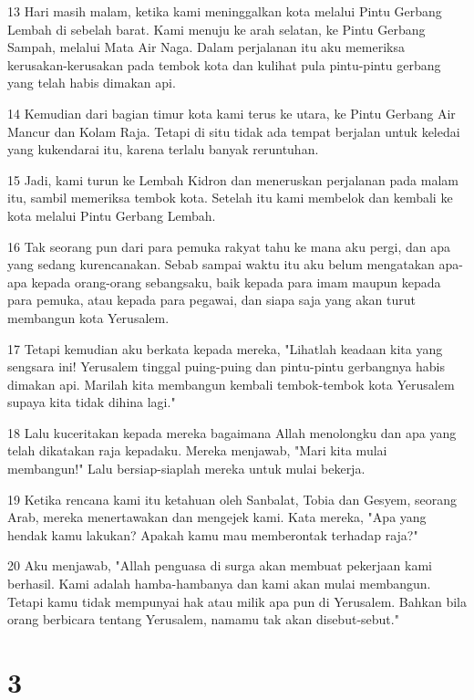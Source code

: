 \par 13 Hari masih malam, ketika kami meninggalkan kota melalui Pintu Gerbang Lembah di sebelah barat. Kami menuju ke arah selatan, ke Pintu Gerbang Sampah, melalui Mata Air Naga. Dalam perjalanan itu aku memeriksa kerusakan-kerusakan pada tembok kota dan kulihat pula pintu-pintu gerbang yang telah habis dimakan api.
\par 14 Kemudian dari bagian timur kota kami terus ke utara, ke Pintu Gerbang Air Mancur dan Kolam Raja. Tetapi di situ tidak ada tempat berjalan untuk keledai yang kukendarai itu, karena terlalu banyak reruntuhan.
\par 15 Jadi, kami turun ke Lembah Kidron dan meneruskan perjalanan pada malam itu, sambil memeriksa tembok kota. Setelah itu kami membelok dan kembali ke kota melalui Pintu Gerbang Lembah.
\par 16 Tak seorang pun dari para pemuka rakyat tahu ke mana aku pergi, dan apa yang sedang kurencanakan. Sebab sampai waktu itu aku belum mengatakan apa-apa kepada orang-orang sebangsaku, baik kepada para imam maupun kepada para pemuka, atau kepada para pegawai, dan siapa saja yang akan turut membangun kota Yerusalem.
\par 17 Tetapi kemudian aku berkata kepada mereka, "Lihatlah keadaan kita yang sengsara ini! Yerusalem tinggal puing-puing dan pintu-pintu gerbangnya habis dimakan api. Marilah kita membangun kembali tembok-tembok kota Yerusalem supaya kita tidak dihina lagi."
\par 18 Lalu kuceritakan kepada mereka bagaimana Allah menolongku dan apa yang telah dikatakan raja kepadaku. Mereka menjawab, "Mari kita mulai membangun!" Lalu bersiap-siaplah mereka untuk mulai bekerja.
\par 19 Ketika rencana kami itu ketahuan oleh Sanbalat, Tobia dan Gesyem, seorang Arab, mereka menertawakan dan mengejek kami. Kata mereka, "Apa yang hendak kamu lakukan? Apakah kamu mau memberontak terhadap raja?"
\par 20 Aku menjawab, "Allah penguasa di surga akan membuat pekerjaan kami berhasil. Kami adalah hamba-hambanya dan kami akan mulai membangun. Tetapi kamu tidak mempunyai hak atau milik apa pun di Yerusalem. Bahkan bila orang berbicara tentang Yerusalem, namamu tak akan disebut-sebut."

\chapter{3}

